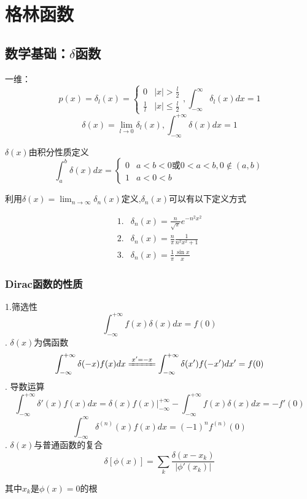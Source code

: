 \newpage
\section{格林函数}
\subsection{数学基础：$\delta$函数}
\begin{dfn}
    一维：
    $$p(x)=\delta_{l}(x)=\begin{cases}0&|x|>\frac{l}{2}\\\frac{1}{l}&|x|\leq\frac{l}{2}\end{cases},     \int_{-\infty}^{\infty}\delta_{l}(x)dx=1$$
    $$\delta(x)=\lim_{l\to0}\delta_{l}(x), \int_{-\infty}^{+\infty}\delta(x)dx=1$$
    
$\delta(x)$由积分性质定义
    $$\int_{a}^{b}\delta(x)dx=
    \begin{cases}0 &a<b<0\text{或}0<a<b,0\notin(a,b)\\
        1&a<0<b
    \end{cases}$$

    利用$\delta(x)=\lim_{n\to\infty}\delta_n(x)$定义,$\delta_n(x)$可以有以下定义方式

    $$\begin{aligned}
        1. &\delta_{n}(x)=\frac{n}{\sqrt{\pi}}e^{-n^{2}x^{2}}\\
        2. &\delta_{n}(x)=\frac{n}{\pi}\frac{1}{n^{2}x^{2}+1}\\
        3. &\delta_{n}(x)=\frac{1}{\pi}\frac{\sin x}{x}
    \end{aligned}$$
\end{dfn}

\subsubsection{Dirac函数的性质}
\noindent 1.筛选性
$$\int_{-\infty}^{+\infty}f(x)\delta(x)dx=f(0)$$
. $\delta(x)$为偶函数
$$\int_{-\infty}^{+\infty}\delta(-x)f(x)dx\xlongequal{x'=-x}\int_{-\infty}^{+\infty}\delta(x')f(-x')dx'=f(0)$$
. 导数运算
$$\int_{-\infty}^{+\infty}\delta'(x)f(x)dx=\delta(x)f(x)\bigg|_{-\infty}^{+\infty}-\int_{-\infty}^{+\infty}f(x)\delta(x)dx=-f'(0)$$
$$\int_{-\infty}^{\infty}\delta^{(n)}(x)f(x)dx=(-1)^{n}f^{(n)}(0)$$
. $\delta(x)$与普通函数的复合
$$\delta[\phi(x)]=\sum_{k}\frac{\delta(x-x_{k})}{|\phi'(x_{k})|}$$

其中$x_k$是$\phi(x)=0$的根

